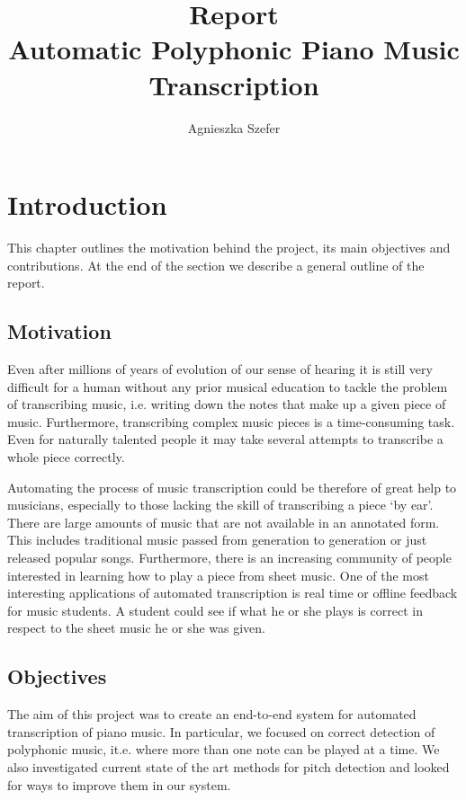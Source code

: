 \documentclass[11pt]{article} %
\title{Report \\ Automatic Polyphonic Piano Music Transcription}
\author{Agnieszka Szefer}
\begin{document}
\newcommand{\myparagraph}[1]{\paragraph{#1}\mbox{}\\}
\maketitle

\listoftodos

\tableofcontents

\newpage



\section{Introduction}
This chapter outlines the motivation behind the project, its main objectives and contributions. At the end of the section we describe a general outline of the report. 

\subsection{Motivation}
Even after millions of years of evolution of our sense of hearing it is still very difficult for a human without any prior musical education to tackle the problem of transcribing music, i.e. writing down the notes that make up a given piece of music. Furthermore, transcribing complex music pieces is a time-consuming task. Even for naturally talented people it may take several attempts to transcribe a whole piece correctly.

Automating the process of music transcription could be therefore of great help to musicians, especially to those lacking the skill of transcribing a piece `by ear'. There are large amounts of music that are not available in an annotated form. This includes traditional music passed from generation to generation or just released popular songs. Furthermore, there is an increasing community of people interested in learning how to play a piece from sheet music.
One of the most interesting applications of automated transcription is real time or offline feedback for music students. A student could see if what he or she plays is correct in respect to the sheet music he or she was given. %
%

\subsection{Objectives}
The aim of this project was to create an end-to-end system for automated transcription of piano music. In particular, we focused on correct detection of polyphonic music, it.e. where more than one note can be played at a time. We also investigated current state of the art methods for pitch detection and looked for ways to improve them in our system.
%
\end{document}
